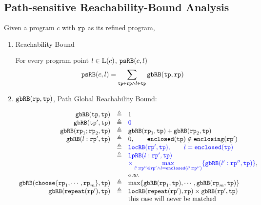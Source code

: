 \subsection{Path-sensitive Reachability-Bound Analysis}
Given a program $c$ with $\mathtt{rp}$ as its refined program,
\begin{enumerate}
    \item Reachability Bound
    
    For every program point $l \in \mathbb{L}(c)$, $\mathtt{psRB}(c, l)$
   \[ 
     \mathtt{psRB}(c, l) = \sum\limits_{\mathtt{tp} \in \mathtt{rp} \land 
   l \in \mathtt{tp}} \mathtt{gbRB}(\mathtt{tp}, \mathtt{rp})
   \]


    
    \item $\mathtt{gbRB}(\mathtt{rp}, \mathtt{tp}) $, Path Global Reachability Bound:
    

    \[
      \begin{array}{rcl}
        \inoutB(\tpath, \tpath) & \triangleq & 1 \\
        \inoutB(\tpath', \tpath) & \triangleq & \highlight{0} \\
        \inoutB(\rprog_1;\rprog_2, \tpath) & \triangleq & \inoutB(\rprog_1, \tpath) + \inoutB(\rprog_2, \tpath) \\
        \inoutB(l: \rprog', \tpath) & \triangleq & 
       0, \qquad \kw{enclosed}(\tpath) \notin \kw{enclosing}(\rprog')
        \\
        & \triangleq & 
        \highlight{\outinB(\rprog', \tpath), \qquad l = \kw{enclosed}(\tpath)}
        \\
        & \triangleq & 
        \highlight{
          \lpchB(l:\rprog', \tpath ) } \\
          & & 
        \highlight{\times \max\limits_{l':\rprog'' \in \rprog' \land l = \kw{enclosed}(l':\rprog'')}
       \{\inoutB(l':\rprog'', \tpath)\} }, \\
       & & o.w.
        \\
        \inoutB(\rpchoose{\rprog_1, \cdots, \rprog_m }, \tpath) & \triangleq 
        & \max\left\{ \inoutB(\rprog_1, \tpath), \cdots, \inoutB(\rprog_m, \tpath) \right\} \\
        \inoutB(\rprepeat(\rprog'), \tpath) & \triangleq & \outinB(\rprepeat(\rprog'), \rprog) \times \inoutB(\rprog', \tpath)\\
        &  & \text{this case will never be matched}
        \end{array}
      \]


\end{enumerate}
